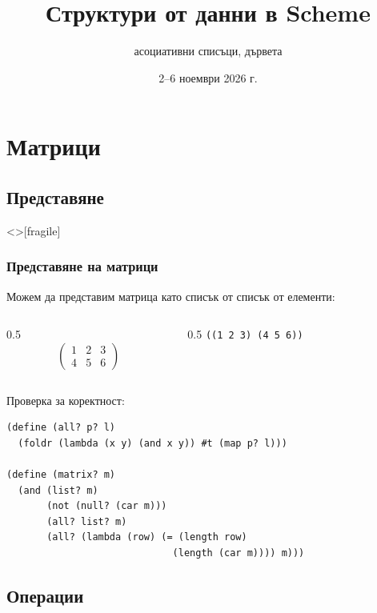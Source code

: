 \documentclass[alsotrans,beameroptions={aspectratio=169}]{beamerswitch}
\title{Структури от данни в Scheme}
\subtitle{\ifbool{matrices}{матрици, }асоциативни списъци, дървета\ifbool{deeplists}{, дълбоки списъци}{}\ifbool{graphs}{, графи}{}}
\date{2--6 ноември 2026 г.}
\begin{document}
\begin{frame}
  \titlepage
\end{frame}

\section{Матрици}

\subsection{Представяне}

\begin{frame}<>[fragile]
  \frametitle{Представяне на матрици}
  Можем да представим матрица като списък от списък от елементи:\\
  \begin{columns}[T,onlytextwidth]
    \begin{column}{0.5\textwidth}
      \begin{equation*}
        \left(
          \begin{array}{ccc}
            1 & 2 & 3\\
            4 & 5 & 6
          \end{array}
        \right)
      \end{equation*}
    \end{column}
    \begin{column}{0.5\textwidth}
      \vspace{2ex}
      \tt{((1 2 3) (4 5 6))}
    \end{column}
  \end{columns}
  \vspace{2ex}
  \pause
  Проверка за коректност:
  \pause
\begin{lstlisting}
(define (all? p? l)
  (foldr (lambda (x y) (and x y)) #t (map p? l)))

(define (matrix? m)
  (and (list? m)
       (not (null? (car m)))
       (all? list? m)
       (all? (lambda (row) (= (length row)
                             (length (car m)))) m)))
\end{lstlisting}
\end{frame}

\subsection{Операции}
\end{document}
